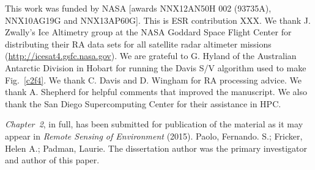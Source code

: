 \noindent
This work was funded by NASA [awards NNX12AN50H 002 (93735A), NNX10AG19G and NNX13AP60G]. This is ESR contribution XXX. We thank J. Zwally's Ice Altimetry group at the NASA Goddard Space Flight Center for distributing their RA data sets for all satellite radar altimeter missions (\url{http://icesat4.gsfc.nasa.gov}). We are grateful to G. Hyland of the Australian Antarctic Division in Hobart for running the Davis S/V algorithm used to make Fig.~\ref{c2f4}. We thank C. Davis and D. Wingham for RA processing advice. We thank A. Shepherd for helpful comments that improved the manuscript. We also thank the San Diego Supercomputing Center for their assistance in HPC. 


{\sl Chapter~2}, in full, has been submitted for publication of the material as it
may appear in {\it Remote Sensing of Environment} (2015). Paolo, Fernando. S.;
Fricker, Helen A.; Padman, Laurie. The dissertation author was the primary
investigator and author of this paper.


